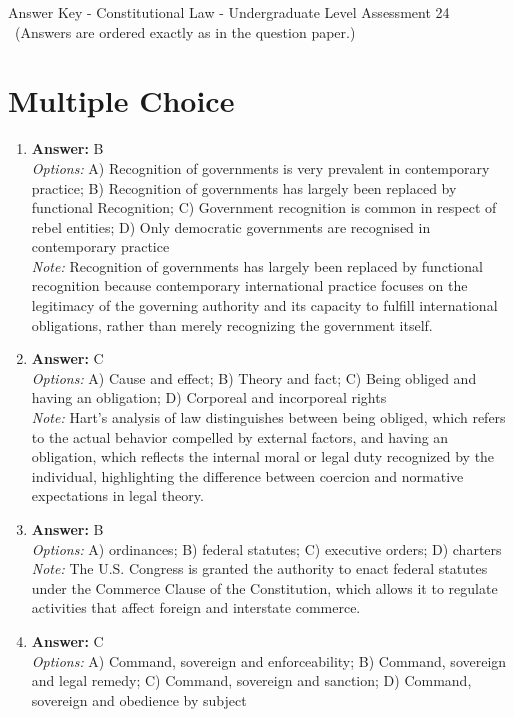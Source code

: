 \documentclass[12pt]{article}
\begin{document}
\begin{center}
Answer Key - Constitutional Law - Undergraduate Level Assessment 24 \
\small (Answers are ordered exactly as in the question paper.)
\end{center}

\section*{Multiple Choice}
\begin{enumerate}[label=\arabic*.]
\item \textbf{Answer:} B
\\ \textit{Options:} A) Recognition of governments is very prevalent in contemporary practice; B) Recognition of governments has largely been replaced by functional Recognition; C) Government recognition is common in respect of rebel entities; D) Only democratic governments are recognised in contemporary practice
\\ \textit{Note:} Recognition of governments has largely been replaced by functional recognition because contemporary international practice focuses on the legitimacy of the governing authority and its capacity to fulfill international obligations, rather than merely recognizing the government itself.
\item \textbf{Answer:} C
\\ \textit{Options:} A) Cause and effect; B) Theory and fact; C) Being obliged and having an obligation; D) Corporeal and incorporeal rights
\\ \textit{Note:} Hart's analysis of law distinguishes between being obliged, which refers to the actual behavior compelled by external factors, and having an obligation, which reflects the internal moral or legal duty recognized by the individual, highlighting the difference between coercion and normative expectations in legal theory.
\item \textbf{Answer:} B
\\ \textit{Options:} A) ordinances; B) federal statutes; C) executive orders; D) charters
\\ \textit{Note:} The U.S. Congress is granted the authority to enact federal statutes under the Commerce Clause of the Constitution, which allows it to regulate activities that affect foreign and interstate commerce.
\item \textbf{Answer:} C
\\ \textit{Options:} A) Command, sovereign and enforceability; B) Command, sovereign and legal remedy; C) Command, sovereign and sanction; D) Command, sovereign and obedience by subject

\end{enumerate}
\end{document}
